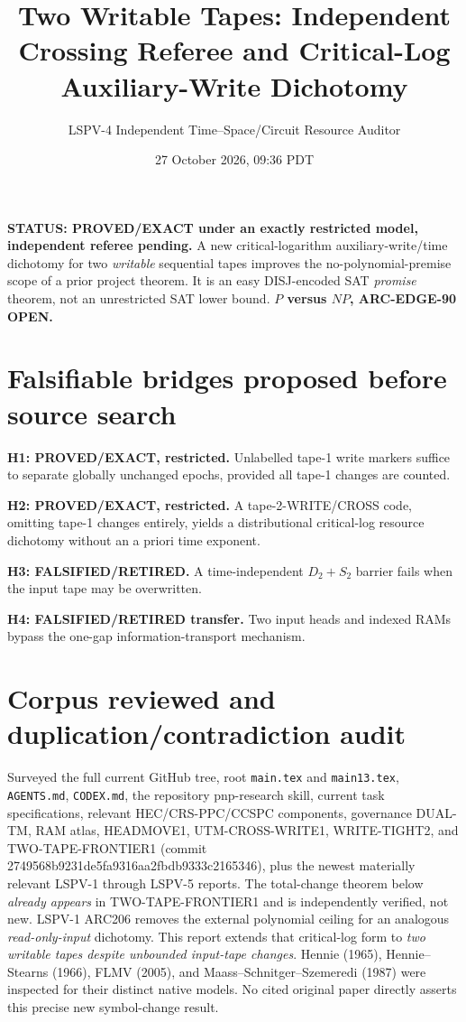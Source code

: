 \documentclass[11pt]{article}
\title{Two Writable Tapes: Independent Crossing Referee and Critical-Log Auxiliary-Write Dichotomy}
\author{LSPV-4 Independent Time--Space/Circuit Resource Auditor}
\date{27 October 2026, 09:36 PDT}
\begin{document}
\maketitle
\noindent\textbf{STATUS: PROVED/EXACT under an exactly restricted model, independent referee pending.}
A new critical-logarithm auxiliary-write/time dichotomy for two \emph{writable} sequential tapes improves the no-polynomial-premise scope of a prior project theorem. It is an easy DISJ-encoded SAT \emph{promise} theorem, not an unrestricted SAT lower bound. \textbf{$P$ versus $NP$, ARC-EDGE-90 OPEN.}

\section*{Falsifiable bridges proposed before source search}
\noindent\textbf{H1: PROVED/EXACT, restricted.} Unlabelled tape-1 write markers suffice to separate globally unchanged epochs, provided all tape-1 changes are counted.
\par\noindent\textbf{H2: PROVED/EXACT, restricted.} A tape-2-WRITE/CROSS code, omitting tape-1 changes entirely, yields a distributional critical-log resource dichotomy without an a priori time exponent.
\par\noindent\textbf{H3: FALSIFIED/RETIRED.} A time-independent $D_2+S_2$ barrier fails when the input tape may be overwritten.
\par\noindent\textbf{H4: FALSIFIED/RETIRED transfer.} Two input heads and indexed RAMs bypass the one-gap information-transport mechanism.

\section*{Corpus reviewed and duplication/contradiction audit}
Surveyed the full current GitHub tree, root \texttt{main.tex} and \texttt{main13.tex}, \texttt{AGENTS.md}, \texttt{CODEX.md}, the repository pnp-research skill, current task specifications, relevant HEC/CRS-PPC/CCSPC components, governance DUAL-TM, RAM atlas, HEADMOVE1, UTM-CROSS-WRITE1, WRITE-TIGHT2, and TWO-TAPE-FRONTIER1 (commit 2749568b9231de5fa9316aa2fbdb9333c2165346), plus the newest materially relevant LSPV-1 through LSPV-5 reports. The total-change theorem below \emph{already appears} in TWO-TAPE-FRONTIER1 and is independently verified, not new. LSPV-1 ARC206 removes the external polynomial ceiling for an analogous \emph{read-only-input} dichotomy. This report extends that critical-log form to \emph{two writable tapes despite unbounded input-tape changes}. Hennie (1965), Hennie--Stearns (1966), FLMV (2005), and Maass--Schnitger--Szemeredi (1987) were inspected for their distinct native models. No cited original paper directly asserts this precise new symbol-change result.
\end{document}
